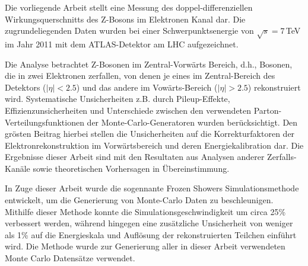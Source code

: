 \documentclass[oneside,11pt]{Classes/PhDthesisPSnPDF}
\begin{document}
\begin{zusamm}
Die vorliegende Arbeit stellt eine Messung des doppel-differenziellen Wirkungsquerschnitts des Z-Bosons im Elektronen Kanal dar. Die zugrundeliegenden Daten wurden bei einer Schwerpunktsenergie von $\sqrt{s} = 7$\,TeV im Jahr 2011 mit dem ATLAS-Detektor am LHC aufgezeichnet.

Die Analyse betrachtet Z-Bosonen im Zentral-Vorw\"arts Bereich, d.h., Bosonen, die in zwei Elektronen zerfallen, von denen je eines im Zentral-Bereich des Detektors ($|\eta| < 2.5$) und das andere im Vow\"arts-Bereich ($|\eta|> 2.5$) rekonstruiert wird. Systematische Unsicherheiten z.B. durch Pileup-Effekte, Effizienzunsicherheiten und Unterschiede zwischen den verwendeten Parton-Verteilungsfunktionen der Monte-Carlo-Generatoren wurden ber\"ucksichtigt. Den gr\"osten Beitrag hierbei stellen die Unsicherheiten auf die Korrekturfaktoren der Elektronrekonstruktion im Vorw\"artsbereich und deren Energiekalibration dar. Die Ergebnisse dieser Arbeit sind mit den Resultaten aus Analysen anderer Zerfalls-Kan\"ale sowie theoretischen Vorhersagen in \"Ubereinstimmung.

In Zuge dieser Arbeit wurde die sogennante Frozen Showers Simulationsmethode entwickelt, um die Generierung von Monte-Carlo Daten zu beschleunigen. Mithilfe dieser Methode konnte die Simulationsgeschwindigkeit um circa 25\% verbessert werden, w\"ahrend hingegen eine zus\"atzliche Unsicherheit von weniger als 1\% auf die Energieskala und Aufl\"osung der rekonstruierten Teilchen einf\"uhrt wird. Die Methode wurde zur Generierung aller in dieser Arbeit verwendeten Monte Carlo Datens\"atze verwendet.
\end{zusamm}


\setcounter{secnumdepth}{3} %
\setcounter{tocdepth}{3}    %
\tableofcontents            %


\newpage
\mainmatter
\newpage

















\end{document}
